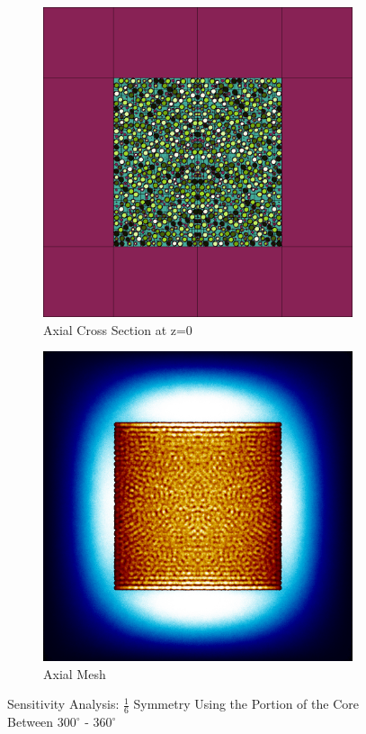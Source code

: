 \begin{figure}[H]
\begin{subfigure}{0.45\textwidth}
  \includegraphics[width=0.95\linewidth]{figures/300-360/300-360-v}
  \caption{Axial Cross Section at z=0 }
  \label{fig:300-360-v}
\end{subfigure}
%
\begin{subfigure}{0.45\textwidth}
  \includegraphics[width=0.95\linewidth]{figures/300-360/300-360-vm}
  \caption{Axial Mesh}
  \label{fig:300-360-vm}
\end{subfigure}
%
\caption{Sensitivity Analysis: $\frac{1}{6}$ Symmetry Using the Portion of the Core Between $300^{\circ}$ - $360^{\circ}$}
\label{fig:300-360}
\end{figure}